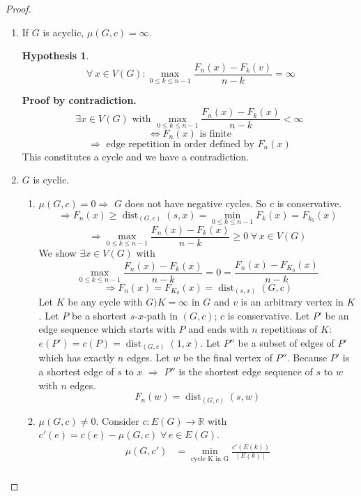 \documentclass[a4paper]{article}
\theoremstyle{definition}
\newtheorem{hypothesis}[theorem]{Hypothesis}
\newcommand{\card}[1]{\left|\:\!#1\:\!\right|}
\newcommand{\gath}[2]{$#1$-$#2$-path} %
\newcommand{\fall}{\;\forall\,}
\begin{document}
\begin{proof}
\begin{enumerate}
  \item If $G$ is acyclic, $\mu(G, c) = \infty$. \\
    \begin{hypothesis}
      \[ \fall x \in V(G): \max_{0 \leq k \leq n-1} \frac{F_n(x) - F_k(v)}{n-k} = \infty \]
    \end{hypothesis}
    \textbf{Proof by contradiction.}
    \[
      \exists x \in V(G) \text{ with } \max_{0 \leq k \leq n-1} \frac{F_n(x) - F_k(x)}{n-k} < \infty
    \] \[
      \Leftrightarrow F_n(x) \text{ is finite}
    \] \[
      \Rightarrow \text{ edge repetition in order defined by } F_n(x)
    \]
    This constitutes a cycle and we have a contradiction.

  \item $G$ is cyclic.
    \begin{enumerate}
      \item $\mu(G, c) = 0 \Rightarrow$ $G$ does not have negative cycles. So $c$ is conservative.
        \[
          \Rightarrow F_n(x) \geq \operatorname{dist}_{(G,c)} (s, x) = \min_{0 \leq k \leq n-1} F_k(x) = F_{k_0}(x)
        \] \[
          \Rightarrow \max_{0 \leq k \leq n-1} \frac{F_n(x) - F_k(x)}{n-k} \geq 0 \fall x \in V(G)
        \]
        We show $\exists x \in V(G)$ with \[
          \max_{0 \leq k \leq n-1} \frac{F_n(x) - F_k(x)}{n-k} = 0
            = \frac{F_n(x) - F_{K_0}(x)}{n-k}
        \] \[
          \Rightarrow F_n(x)
            = F_{K_0}(x)
            = \operatorname{dist}_{(s, x)}(G, c)
        \]
        Let $K$ be any cycle with $G)K = \infty$ in $G$ and $v$ is an arbitrary vertex in $K$. Let $P$ be a shortest \gath sx in $(G, c)$; $c$ is conservative. Let $P'$ be an edge sequence which starts with $P$ and ends with $n$ repetitions of $K$: $e(P') = c(P) = \operatorname{dist}_{(G, c)}(1, x)$. Let $P''$ be a subset of edges of $P'$ which has exactly $n$ edges. Let $w$ be the final vertex of $P''$. Because $P'$ is a shortest edge of $s$ to $x$ $\Rightarrow$ $P''$ is the shortest edge sequence of $s$ to $w$ with $n$ edges.
        \[
          F_n(w) = \operatorname{dist}_{(G, c)}(s, w)
        \]
      \item $\mu(G, c) \neq 0$. Consider $c: E(G) \rightarrow \mathbb{R}$ with $c'(e) = c(e) - \mu(G, c) \fall e \in E(G)$.
        \begin{align*}
          \mu(G, c') &= \min_{\text{cycle K in G}} \frac{c'(E(k))}{\card{E(k)}} \\

\end{align*}
\end{enumerate}
\end{enumerate}
\end{proof}
\end{document}
